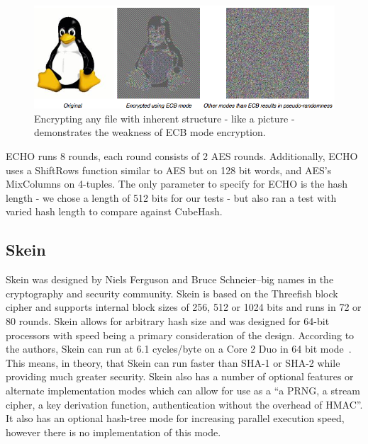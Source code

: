 \begin{figure}[htp]
\includegraphics[width=\textwidth]{../data/ECB.png}
\caption{Encrypting any file with inherent structure - like a picture - demonstrates the weakness of ECB mode encryption.\cite{CodeBook}}\label{fig:ecb}
\end{figure}

ECHO runs 8 rounds, each round consists of 2 AES rounds.
Additionally, ECHO uses a ShiftRows function similar to AES but on 128 bit words, and AES's MixColumns on 4-tuples.
The only parameter to specify for ECHO is the hash length - we chose a length of 512 bits for our tests - but also ran a test with varied hash length to compare against CubeHash.

\subsection*{Skein}

Skein was designed by Niels Ferguson and Bruce Schneier--big names in the cryptography and security community.
Skein is based on the Threefish block cipher and supports internal block sizes of 256, 512 or 1024 bits and runs in 72 or 80 rounds.
Skein allows for arbitrary hash size and was designed for 64-bit processors with speed being a primary consideration of the design.
According to the authors, Skein can run at 6.1 cycles/byte on a Core 2 Duo in 64 bit mode~\cite{SkeinSpeed}.
This means, in theory, that Skein can run faster than SHA-1 or SHA-2 while providing much greater security.
Skein also has a number of optional features or alternate implementation modes which can allow for use as a ``a PRNG, a stream cipher, a key derivation function, authentication without the overhead of HMAC''\cite{SkeinSpeed}.
It also has an optional hash-tree mode for increasing parallel execution speed, however there is no implementation of this mode. 

